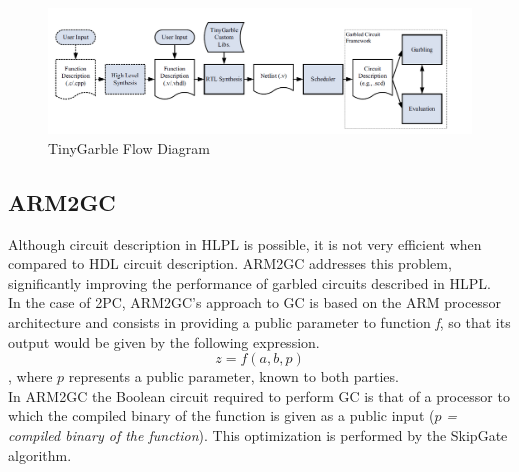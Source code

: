 \begin{refsection}
\renewcommand{\figurename}{Figure}
\begin{figure}[H]
\centering
\includegraphics[width=.9\linewidth]{./sdf/classical_mpc/figures/tinygarble_flow_diagram}
\caption{TinyGarble Flow Diagram}
\label{fig:tgdiagram}
\end{figure}

\subsection{ARM2GC}
Although circuit description in HLPL is possible, it is not very efficient when compared to HDL circuit description. ARM2GC addresses this problem, significantly improving the performance of garbled circuits described in HLPL.\\
In the case of 2PC, ARM2GC's approach to GC is based on the ARM processor architecture and consists in providing a public parameter to function \textit{f}, so that its output would be given by the following expression.
\begin{equation}\label{eq:arm2gc}
z = f(a,b,p)
\end{equation}
, where $p$ represents a public parameter, known to both parties.\\
In ARM2GC the Boolean circuit required to perform GC is that of a processor to which the compiled binary of the function is given as a public input ($p$\textit{ = compiled binary of the function}). This optimization is performed by the SkipGate algorithm.



\clearpage
\printbibliography[heading=subbibliography]
\end{refsection}
\cleardoublepage
